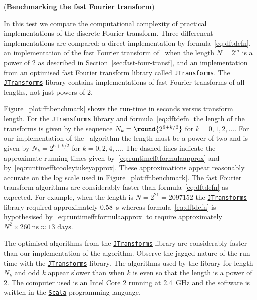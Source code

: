 \begin{test}\label{test:fastftbenchmarks}
(\textbf{Benchmarking the fast Fourier transform})

In this test we compare the computational complexity of practical implementations of the discrete Fourier transform.  Three differenent implementations are compared: a direct implementation by formula~\eqref{eq:dftdefn}, an implementation of  the fast Fourier transform of~\citet{Cooley_tukey_1965} when the length $N = 2^m$ is a power of 2 as described in Section~\ref{sec:fast-four-transf}, and an implementation from an optimised fast Fourier transform library called \href{https://github.com/wendykierp/JTransforms}{\texttt{JTransforms}}.  The \href{https://github.com/wendykierp/JTransforms}{\texttt{JTransforms}} library contains implementations of fast Fourier transforms of all lengths, not just powers of 2.

Figure~\ref{plot:fftbenchmark} shows the run-time in seconds versus transform length.  For the \href{https://github.com/wendykierp/JTransforms}{\texttt{JTransforms}} library and formula~\eqref{eq:dftdefn} the length of the transforms is given by the sequence $N_k = \round{2^{6 + k/2}}$ for $k = 0,1,2,\dots$.  For our implementation of the~\citet{Cooley_tukey_1965} algorithm the length must be a power of two and is given by $N_k = 2^{6 + k/2}$ for $k = 0,2,4,\dots$.  The dashed lines indicate the approximate running times given by~\eqref{eq:runtimefftformulaapprox} and by~\eqref{eq:runtimefftcooleytukeyapprox}.  These approximations appear reasonably accurate on the log scale used in Figure~\ref{plot:fftbenchmark}.  The fast Fourier transform algorithms are considerably faster than formula~\eqref{eq:dftdefn} as expected.  For example, when the length is $N = 2^{21} = 2097152$ the \href{https://github.com/wendykierp/JTransforms}{\texttt{JTransforms}} library required approximately \SI{0.58}{\second} whereas formula~\eqref{eq:dftdefn} is hypothesised by~\eqref{eq:runtimefftformulaapprox} to require approximately $N^2\times \SI{260}{\nano\second} \approx \text{13 days}$.

The optimised algorithms from the \href{https://github.com/wendykierp/JTransforms}{\texttt{JTransforms}} library are considerably faster than our implementation of the \citet{Cooley_tukey_1965} algorithm.  Observe the jagged nature of the run-time with the \href{https://github.com/wendykierp/JTransforms}{\texttt{JTransforms}} library.  The algorithms used by the library for length $N_k$ and odd $k$ appear slower than when $k$ is even so that the length is a power of 2.  The computer used is an Intel Core 2 running at \SI{2.4}{\giga\hertz} and the software is written in the \href{http://scala-lang.org/}{\texttt{Scala}} programming language.

\end{test}

